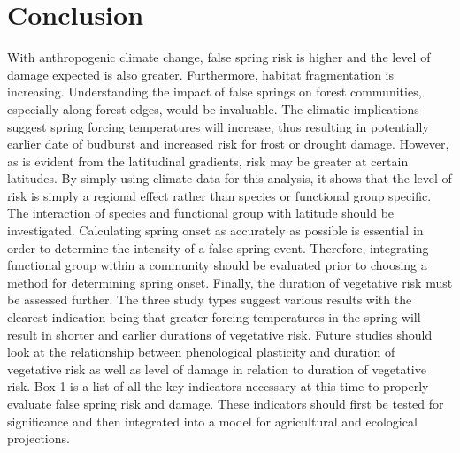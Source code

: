 \documentclass{article}\usepackage[]{graphicx}\usepackage[]{color}
\begin{document}
\section*{Conclusion}
With anthropogenic climate change, false spring risk is higher and the level of damage expected is also greater. Furthermore, habitat fragmentation is increasing. Understanding the impact of false springs on forest communities, especially along forest edges, would be invaluable. The climatic implications suggest spring forcing temperatures will increase, thus resulting in potentially earlier date of budburst and increased risk for frost or drought damage. However, as is evident from the latitudinal gradients, risk may be greater at certain latitudes. By simply using climate data for this analysis, it shows that the level of risk is simply a regional effect rather than species or functional group specific. The interaction of species and functional group with latitude should be investigated. Calculating spring onset as accurately as possible is essential in order to determine the intensity of a false spring event. Therefore, integrating functional group within a community should be evaluated prior to choosing a method for determining spring onset. Finally, the duration of vegetative risk must be assessed further. The three study types suggest various results with the clearest indication being that greater forcing temperatures in the spring will result in shorter and earlier durations of vegetative risk. Future studies should look at the relationship between phenological plasticity and duration of vegetative risk as well as level of damage in relation to duration of vegetative risk. Box 1 is a list of all the key indicators necessary at this time to properly evaluate false spring risk and damage. These indicators should first be tested for significance and then integrated into a model for agricultural and ecological projections. 
\end{document}
